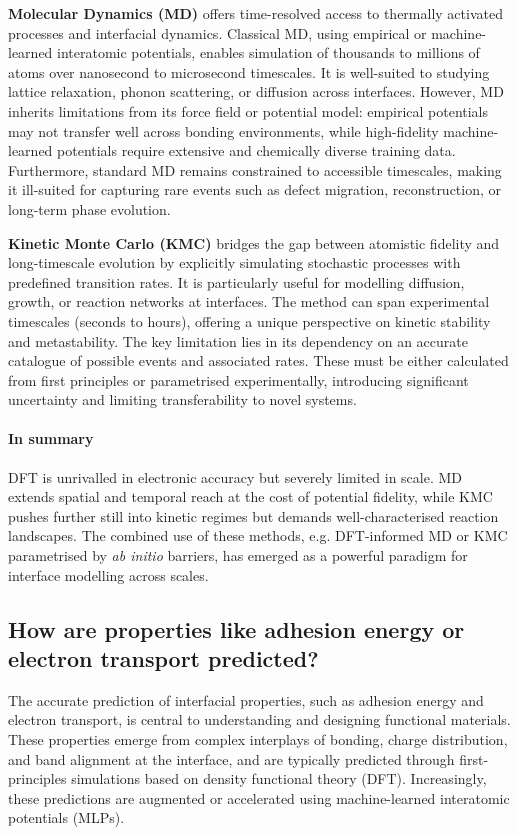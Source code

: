 \textbf{Molecular Dynamics (MD)} offers time-resolved access to thermally activated processes and interfacial dynamics. Classical MD, using empirical or machine-learned interatomic potentials, enables simulation of thousands to millions of atoms over nanosecond to microsecond timescales. It is well-suited to studying lattice relaxation, phonon scattering, or diffusion across interfaces. However, MD inherits limitations from its force field or potential model: empirical potentials may not transfer well across bonding environments, while high-fidelity machine-learned potentials require extensive and chemically diverse training data. Furthermore, standard MD remains constrained to accessible timescales, making it ill-suited for capturing rare events such as defect migration, reconstruction, or long-term phase evolution.

\textbf{Kinetic Monte Carlo (KMC)} bridges the gap between atomistic fidelity and long-timescale evolution by explicitly simulating stochastic processes with predefined transition rates. It is particularly useful for modelling diffusion, growth, or reaction networks at interfaces. The method can span experimental timescales (seconds to hours), offering a unique perspective on kinetic stability and metastability. The key limitation lies in its dependency on an accurate catalogue of possible events and associated rates. These must be either calculated from first principles or parametrised experimentally, introducing significant uncertainty and limiting transferability to novel systems.

\paragraph{In summary} DFT is unrivalled in electronic accuracy but severely limited in scale. MD extends spatial and temporal reach at the cost of potential fidelity, while KMC pushes further still into kinetic regimes but demands well-characterised reaction landscapes. The combined use of these methods, e.g. DFT-informed MD or KMC parametrised by \textit{ab initio} barriers, has emerged as a powerful paradigm for interface modelling across scales.

\subsection{How are properties like adhesion energy or electron transport predicted?}

The accurate prediction of interfacial properties, such as adhesion energy and electron transport, is central to understanding and designing functional materials. These properties emerge from complex interplays of bonding, charge distribution, and band alignment at the interface, and are typically predicted through first-principles simulations based on density functional theory (DFT). Increasingly, these predictions are augmented or accelerated using machine-learned interatomic potentials (MLPs).


